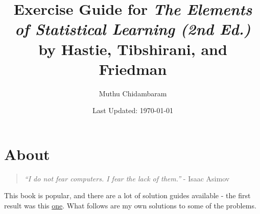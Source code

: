 \documentclass{article}
\begin{document}
\title{Exercise Guide for \textit{The Elements of Statistical Learning (2nd Ed.)} by Hastie, Tibshirani, and Friedman}
\author{Muthu Chidambaram}
\date{Last Updated: \today}

\maketitle

\tableofcontents
\newpage 

\section*{About}

\begin{quote}
        \textit{``I do not fear computers. I fear the lack of them.''} - Isaac Asimov
\end{quote}

This book is popular, and there are a lot of solution guides available - the first result was this 
\href{https://waxworksmath.com/Authors/G_M/Hastie/WriteUp/Weatherwax_Epstein_Hastie_Solution_Manual.pdf}{one}.
What follows are my own solutions to some of the problems.



\end{document}
